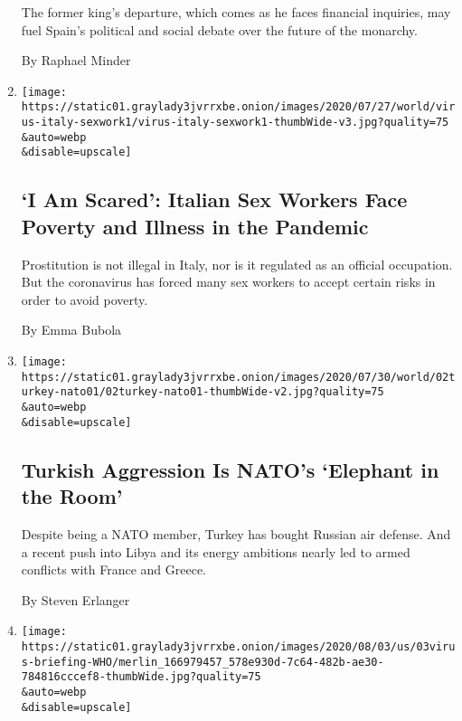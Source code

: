 \begin{enumerate}
  The former king's departure, which comes as he faces financial
  inquiries, may fuel Spain's political and social debate over the
  future of the monarchy.

  By Raphael Minder
\item
  \href{/2020/08/03/world/europe/italy-coronavirus-prostitution-sex-work.html}{}

  \texttt{[image: https://static01.graylady3jvrrxbe.onion/images/2020/07/27/world/virus-italy-sexwork1/virus-italy-sexwork1-thumbWide-v3.jpg?quality=75\\\&auto=webp\\\&disable=upscale]}

  \hypertarget{i-am-scared-italian-sex-workers-face-poverty-and-illness-in-the-pandemic}{%
  \subsection{`I Am Scared': Italian Sex Workers Face Poverty and
  Illness in the
  Pandemic}\label{i-am-scared-italian-sex-workers-face-poverty-and-illness-in-the-pandemic}}

  Prostitution is not illegal in Italy, nor is it regulated as an
  official occupation. But the coronavirus has forced many sex workers
  to accept certain risks in order to avoid poverty.

  By Emma Bubola
\item
  \href{/2020/08/03/world/europe/turkey-nato.html}{}

  \texttt{[image: https://static01.graylady3jvrrxbe.onion/images/2020/07/30/world/02turkey-nato01/02turkey-nato01-thumbWide-v2.jpg?quality=75\\\&auto=webp\\\&disable=upscale]}

  \hypertarget{turkish-aggression-is-natos-elephant-in-the-room}{%
  \subsection{Turkish Aggression Is NATO's `Elephant in the
  Room'}\label{turkish-aggression-is-natos-elephant-in-the-room}}

  Despite being a NATO member, Turkey has bought Russian air defense.
  And a recent push into Libya and its energy ambitions nearly led to
  armed conflicts with France and Greece.

  By Steven Erlanger
\item
  \href{/video/world/europe/100000007269932/who-coronavirus-briefing.html}{}

  \texttt{[image: https://static01.graylady3jvrrxbe.onion/images/2020/08/03/us/03virus-briefing-WHO/merlin\_166979457\_578e930d-7c64-482b-ae30-784816cccef8-thumbWide.jpg?quality=75\\\&auto=webp\\\&disable=upscale]}


\end{enumerate}
